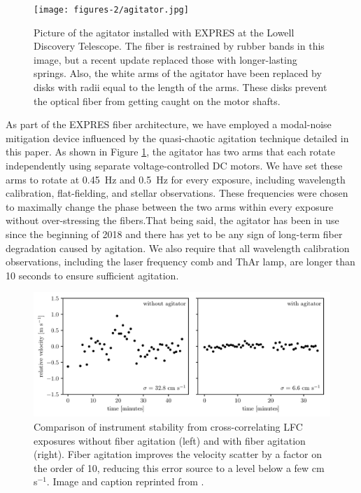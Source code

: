 \begin{figure}
    \centering
    \texttt{[image: figures-2/agitator.jpg]}
    \caption[The EXPRES fiber agitator]{Picture of the agitator installed with EXPRES at the Lowell Discovery Telescope. The fiber is restrained by rubber bands in this image, but a recent update replaced those with longer-lasting springs. Also, the white arms of the agitator have been replaced by disks with radii equal to the length of the arms. These disks prevent the optical fiber from getting caught on the motor shafts.}
    \label{fig:agitator}
\end{figure}

As part of the EXPRES fiber architecture, we have employed a modal-noise mitigation device influenced by the quasi-chaotic agitation technique detailed in this paper. As shown in Figure \ref{fig:agitator}, the agitator has two arms that each rotate independently using separate voltage-controlled DC motors. We have set these arms to rotate at \SI{0.45}{\hertz} and \SI{0.5}{\hertz} for every exposure, including wavelength calibration, flat-fielding, and stellar observations. These frequencies were chosen to maximally change the phase between the two arms within every exposure without over-stressing the fibers.That being said, the agitator has been in use since the beginning of 2018 and there has yet to be any sign of long-term fiber degradation caused by agitation. We also require that all wavelength calibration observations, including the laser frequency comb and ThAr lamp, are longer than 10 seconds to ensure sufficient agitation. 

\begin{figure}
    \centering
    \includegraphics[width=\textwidth]{figures-2/lfc_agitator_comp.pdf}
    \caption[EXPRES stability with and without fiber agitation]{Comparison of instrument stability from cross-correlating LFC exposures without fiber agitation (left) and with fiber agitation (right). Fiber agitation improves the velocity scatter by a factor on the order of 10, reducing this error source to a level below a few cm s$^{-1}$. Image and caption reprinted from \citet{blackman_performance_2020}.}
    \label{fig:lfc-agitator-comp}
\end{figure}

